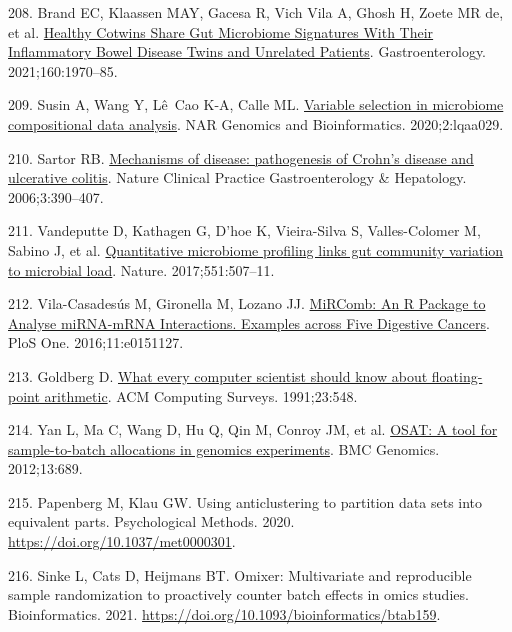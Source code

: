 \documentclass[
  12pt,
  a4paper,
  twoside,
  openright]{book}
\newlength{\cslhangindent}
\newlength{\cslentryspacingunit} %
\newenvironment{CSLReferences}[2] %
 {%
  \setlength{\parindent}{0pt}
  \ifodd #1
  \let\oldpar\par
  \def\par{\hangindent=\cslhangindent\oldpar}
  \fi
  \setlength{\parskip}{#2\cslentryspacingunit}
 }%
 {}
\begin{document}
\begin{CSLReferences}{0}{0}
\leavevmode{}%
208. Brand EC, Klaassen MAY, Gacesa R, Vich Vila A, Ghosh H, Zoete MR de, et al. \href{https://doi.org/10.1053/j.gastro.2021.01.030}{Healthy Cotwins Share Gut Microbiome Signatures With Their Inflammatory Bowel Disease Twins and Unrelated Patients}. Gastroenterology. 2021;160:1970--85.

\leavevmode{}%
209. Susin A, Wang Y, Lê~Cao K-A, Calle ML. \href{https://doi.org/10.1093/nargab/lqaa029}{Variable selection in microbiome compositional data analysis}. NAR Genomics and Bioinformatics. 2020;2:lqaa029.

\leavevmode{}%
210. Sartor RB. \href{https://doi.org/10.1038/ncpgasthep0528}{Mechanisms of disease: pathogenesis of Crohn's disease and ulcerative colitis}. Nature Clinical Practice Gastroenterology \& Hepatology. 2006;3:390--407.

\leavevmode{}%
211. Vandeputte D, Kathagen G, D'hoe K, Vieira-Silva S, Valles-Colomer M, Sabino J, et al. \href{https://doi.org/10.1038/nature24460}{Quantitative microbiome profiling links gut community variation to microbial load}. Nature. 2017;551:507--11.

\leavevmode{}%
212. Vila-Casadesús M, Gironella M, Lozano JJ. \href{https://doi.org/10.1371/journal.pone.0151127}{MiRComb: An R Package to Analyse miRNA-mRNA Interactions. Examples across Five Digestive Cancers}. PloS One. 2016;11:e0151127.

\leavevmode{}%
213. Goldberg D. \href{https://doi.org/10.1145/103162.103163}{What every computer scientist should know about floating-point arithmetic}. ACM Computing Surveys. 1991;23:548.

\leavevmode{}%
214. Yan L, Ma C, Wang D, Hu Q, Qin M, Conroy JM, et al. \href{https://doi.org/10.1186/1471-2164-13-689}{OSAT: A tool for sample-to-batch allocations in genomics experiments}. BMC Genomics. 2012;13:689.

\leavevmode{}%
215. Papenberg M, Klau GW. Using anticlustering to partition data sets into equivalent parts. Psychological Methods. 2020. \url{https://doi.org/10.1037/met0000301}.

\leavevmode{}%
216. Sinke L, Cats D, Heijmans BT. Omixer: Multivariate and reproducible sample randomization to proactively counter batch effects in omics studies. Bioinformatics. 2021. \url{https://doi.org/10.1093/bioinformatics/btab159}.


\end{CSLReferences}
\end{document}
